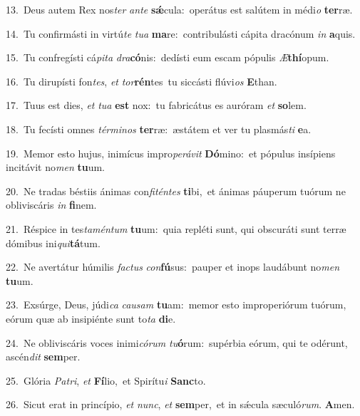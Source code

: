 {\numbfont\textcolor{\numbcolor}{13.}}~Deus autem Rex nos\textit{ter} \textit{an}\-\textit{te} \textbf{sǽ}\-cula:~\star operátus est salútem in médi\textit{o} \textbf{ter}\-ræ.\par
{\numbfont\textcolor{\numbcolor}{14.}}~Tu confirmásti in virtú\textit{te} \textit{tu}\-\textit{a} \textbf{ma}\-re:~\star contribulásti cápita dracónum \textit{in} \textbf{a}\-quis.\par
{\numbfont\textcolor{\numbcolor}{15.}}~Tu confregísti cá\-\textit{pi}\-\textit{ta} \textit{dra}\-\textbf{có}nis:~\star dedísti eum escam pópulis \textit{Æ}\-\textbf{thí}opum.\par
{\numbfont\textcolor{\numbcolor}{16.}}~Tu dirupísti fon\-\textit{tes}\-, \textit{et} \textit{tor}\-\textbf{rén}tes~\star tu siccásti flúvi\textit{os} \textbf{E}\-than.\par
{\numbfont\textcolor{\numbcolor}{17.}}~Tuus est dies, \textit{et} \textit{tu}\-\textit{a} \textbf{est} nox:~\star tu fabricátus es auróram \textit{et} \textbf{so}\-lem.\par
{\numbfont\textcolor{\numbcolor}{18.}}~Tu fecísti omnes \textit{tér}\-\textit{mi}\textit{nos} \textbf{ter}\-ræ:~\star æstátem et ver tu plasmás\textit{ti} \textbf{e}\-a.\par
{\numbfont\textcolor{\numbcolor}{19.}}~Memor esto hujus, inimícus impro\-\textit{pe}\-\textit{rá}\textit{vit} \textbf{Dó}\-mino:~\star et pópulus insípiens incitávit no\textit{men} \textbf{tu}\-um.\par
{\numbfont\textcolor{\numbcolor}{20.}}~Ne tradas béstiis ánimas con\-\textit{fi}\-\textit{tén}\textit{tes} \textbf{ti}\-bi,~\star et ánimas páuperum tuórum ne obliviscáris \textit{in} \textbf{fi}\-nem.\par
{\numbfont\textcolor{\numbcolor}{21.}}~Réspice in tes\-\textit{ta}\-\textit{mén}\textit{tum} \textbf{tu}\-um:~\star quia repléti sunt, qui obscuráti sunt terræ dómibus ini\-\textit{qui}\-\textbf{tá}tum.\par
{\numbfont\textcolor{\numbcolor}{22.}}~Ne avertátur húmilis \textit{fac}\-\textit{tus} \textit{con}\-\textbf{fú}sus:~\star pauper et inops laudábunt no\textit{men} \textbf{tu}\-um.\par
{\numbfont\textcolor{\numbcolor}{23.}}~Exsúrge, Deus, júdi\textit{ca} \textit{cau}\-\textit{sam} \textbf{tu}\-am:~\star memor esto improperiórum tuórum, eórum quæ ab insipiénte sunt to\textit{ta} \textbf{di}\-e.\par
{\numbfont\textcolor{\numbcolor}{24.}}~Ne obliviscáris voces inimi\-\textit{có}\-\textit{rum} \textit{tu}\-\textbf{ó}rum:~\star supérbia eórum, qui te odérunt, ascén\textit{dit} \textbf{sem}\-per.\par
{\numbfont\textcolor{\numbcolor}{25.}}~Glória \textit{Pa}\-\textit{tri}, \textit{et} \textbf{Fí}\-lio,~\star et Spirítu\textit{i} \textbf{Sanc}\-to.\par
{\numbfont\textcolor{\numbcolor}{26.}}~Sicut erat in princípio, \textit{et} \textit{nunc}\-, \textit{et} \textbf{sem}\-per,~\star et in sǽcula sæculó\-\textit{rum}\-. \textbf{A}\-men.\par
